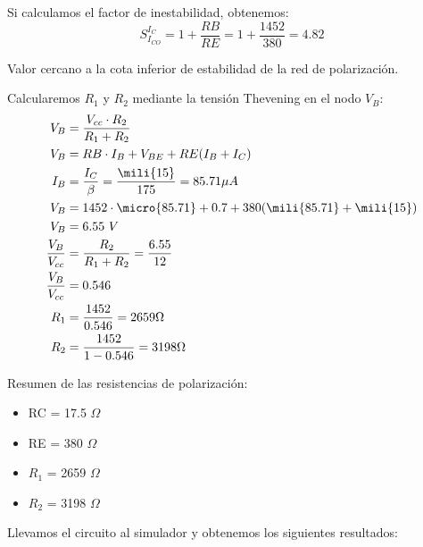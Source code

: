 Si calculamos el factor de inestabilidad, obtenemos:
\begin{equation}
S_{I_{CO}}^{I_C}= 1 + \dfrac{RB}{RE} = 1 + \dfrac{1452}{380} = 4.82 
\end{equation}

Valor cercano a la cota inferior de estabilidad de la red  de
polarización.

Calcularemos $R_1$ y $R_2$ mediante la tensión Thevening en el nodo
$V_B$:
\begin{equation}
  \begin{split}
    V_B & = \dfrac{V_{cc}\cdot R_2}{R_1+R_2}\\
    V_B & = RB \cdot I_B + V_{BE} + RE(I_B+I_C)\\
    I_B & = \dfrac{I_C}{\beta} = \dfrac{\mili{15}}{175} = 85.71\mu A\\
    V_B & = 1452 \cdot \micro{85.71} +0.7 + 380 (\mili{85.71}+\mili{15})\\
    V_B & = 6.55 \ V \\
    \dfrac{V_B}{V_{cc}} & = \dfrac{R_2}{R_1+R_2} = \dfrac{6.55}{12} \\
    \dfrac{V_B}{V_{cc}} & = 0.546 \\
    R_1 & = \dfrac{1452}{0.546} = 2659 \Omega\\
    R_2 & = \dfrac{1452}{1-0.546} = 3198 \Omega\\
    \end{split}
  \end{equation}

Resumen de las resistencias de polarización:
\begin{itemize}
\item RC = 17.5 $\Omega$
\item RE = 380 $\Omega$
\item $R_1$ = 2659 $\Omega$
\item $R_2$ = 3198 $\Omega$
\end{itemize}

Llevamos el circuito al simulador y obtenemos los siguientes
resultados:

